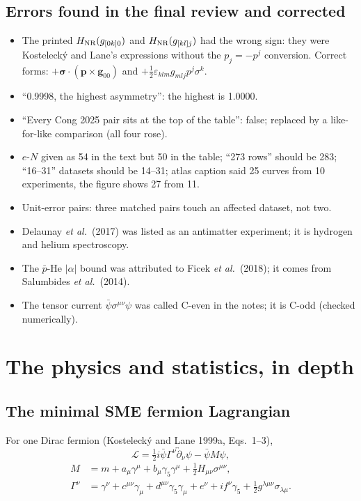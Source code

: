\documentclass[11pt,a4paper]{article}
\newcommand{\sig}{\bm{\sigma}}
\begin{document}
\subsection{Errors found in the final review and corrected}

\begin{itemize}[leftmargin=1.2em]
\item The printed $H_{\rm NR}(g_{[0k]0})$ and $H_{\rm NR}(g_{[kl]j})$ had
the wrong sign: they were Kostelecký and Lane's expressions without the
$p_j=-p^j$ conversion. Correct forms: $+\sig\cdot(\mathbf p\times
\mathbf g_{00})$ and $+\tfrac12\varepsilon_{klm}g_{mlj}p^j\sigma^k$.
\item ``0.9998, the highest asymmetry'': the highest is 1.0000.
\item ``Every Cong 2025 pair sits at the top of the table'': false; replaced
by a like-for-like comparison (all four rose).
\item $e$-$N$ given as 54 in the text but 50 in the table; ``273 rows''
should be 283; ``16--31'' datasets should be 14--31; atlas caption said 25
curves from 10 experiments, the figure shows 27 from 11.
\item Unit-error pairs: three matched pairs touch an affected dataset, not
two.
\item Delaunay \textit{et al.}\ (2017) was listed as an antimatter
experiment; it is hydrogen and helium spectroscopy.
\item The $\bar p$-He $|\alpha|$ bound was attributed to Ficek \textit{et al.}\
(2018); it comes from Salumbides \textit{et al.}\ (2014).
\item The tensor current $\bar\psi\sigma^{\mu\nu}\psi$ was called C-even in
the notes; it is C-odd (checked numerically).
\end{itemize}

\section{The physics and statistics, in depth}
\label{part:physics}

\subsection{The minimal SME fermion Lagrangian}

For one Dirac fermion (Kostelecký and Lane 1999a, Eqs.~1--3),
\begin{equation}
\mathcal L=\tfrac12 i\bar\psi\Gamma^\nu\overleftrightarrow{\partial}_\nu\psi
-\bar\psi M\psi,
\end{equation}
\begin{align}
M&=m+a_\mu\gamma^\mu+b_\mu\gamma_5\gamma^\mu+\tfrac12H_{\mu\nu}\sigma^{\mu\nu},\\
\Gamma^\nu&=\gamma^\nu+c^{\mu\nu}\gamma_\mu+d^{\mu\nu}\gamma_5\gamma_\mu
+e^\nu+if^\nu\gamma_5+\tfrac12g^{\lambda\mu\nu}\sigma_{\lambda\mu}.
\end{align}
\end{document}
